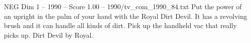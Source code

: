 \begin{textsample}{NEG Dim 1 – 1990 – Score 1.00 – 1990/tv\_com\_1990\_84.txt}  \label{ex:f1_neg_049}
Put the power of an upright in the palm of your hand with the Royal Dirt Devil.
It has a revolving brush and it can handle all kinds of dirt.
Pick up the handheld vac that really picks up.
Dirt Devil by Royal.

\end{textsample}
